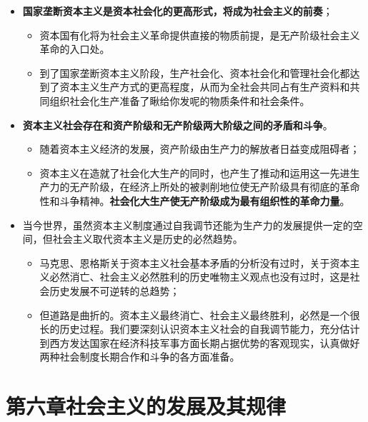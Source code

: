 \documentclass[12pt,openany]{ctexbook}
\begin{document}
\begin{itemize}
\begin{itemize}
\begin{itemize}
  \item 从资本积累过程来看，资本主义基本矛盾在基本积累过程中不断发展，资本的不断积累为否定资本主义制度自身准备了物质条件；
  \item 当资本主义基本矛盾及其派生的各种矛盾在资本积累中不断发展，资本主义生产关系不再适应生产力状况时，公有制取代私有制、社会主义取代资本主义就将成为不可避免的结果。这是资本积累过程所具有的客观历史趋势。
\end{itemize}
  \item \textbf{国家垄断资本主义是资本社会化的更高形式，将成为社会主义的前奏}；
\begin{itemize}
  \item 资本国有化将为社会主义革命提供直接的物质前提，是无产阶级社会主义革命的入口处。
  \item 到了国家垄断资本主义阶段，生产社会化、资本社会化和管理社会化都达到了资本主义生产方式的更高程度，从而为全社会共同占有生产资料和共同组织社会化生产准备了瞅给你发呢的物质条件和社会条件。
\end{itemize}
  \item \textbf{资本主义社会存在和资产阶级和无产阶级两大阶级之间的矛盾和斗争}。
\begin{itemize}
  \item 随着资本主义经济的发展，资产阶级由生产力的解放者日益变成阻碍者；
  \item 资本主义在造就了社会化大生产的同时，也产生了推动和运用这一先进生产力的无产阶级，在经济上所处的被剥削地位使无产阶级具有彻底的革命性和斗争精神。\textbf{社会化大生产使无产阶级成为最有组织性的革命力量}。
\end{itemize}
  \item 当今世界，虽然资本主义制度通过自我调节还能为生产力的发展提供一定的空间，但社会主义取代资本主义是历史的必然趋势。
\begin{itemize}
  \item 马克思、恩格斯关于资本主义社会基本矛盾的分析没有过时，关于资本主义必然消亡、社会主义必然胜利的历史唯物主义观点也没有过时，这是社会历史发展不可逆转的总趋势；
  \item 但道路是曲折的。资本主义最终消亡、社会主义最终胜利，必然是一个很长的历史过程。我们要深刻认识资本主义社会的自我调节能力，充分估计到西方发达国家在经济科技军事方面长期占据优势的客观现实，认真做好两种社会制度长期合作和斗争的各方面准备。
\end{itemize}
\end{itemize}
\end{itemize}
\chapter{第六章\quad{}社会主义的发展及其规律}
\end{document}
